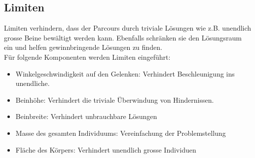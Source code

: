     \subsection{Limiten\label{sub:IntroReqLimit}}

      Limiten verhindern, dass der Parcours durch triviale Lösungen wie z.B. unendlich grosse Beine bewältigt werden kann.
      Ebenfalls schränken sie den Lösungsraum ein und helfen gewinnbringende Lösungen zu finden.
      \\
      Für folgende Komponenten werden Limiten eingeführt:

      \begin{itemize}
        \item Winkelgeschwindigkeit auf den Gelenken: Verhindert Beschleunigung ins unendliche.
        \item Beinhöhe: Verhindert die triviale Überwindung von Hindernissen.
        \item Beinbreite: Verhindert unbrauchbare Lösungen
        \item Masse des gesamten Individuums: Vereinfachung der Problemstellung
        \item Fläche des Körpers: Verhindert unendlich grosse Individuen
      \end{itemize}
